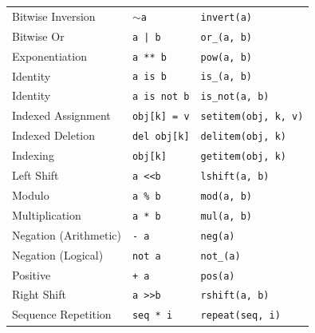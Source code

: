 \documentclass{l4proj}
\begin{document}
\begin{table}[]
\begin{tabular}{@{}lll@{}}
    Bitwise Inversion     & \texttt{$\sim$a}                        & \texttt{invert(a)}                                    \\
    Bitwise Or            & \texttt{a | b}                          & \texttt{or\_(a, b)}                                   \\
    Exponentiation        & \texttt{a ** b}                         & \texttt{pow(a, b)}                                    \\
    Identity              & \texttt{a is b}                         & \texttt{is\_(a, b)}                                   \\
    Identity              & \texttt{a is not b}                     & \texttt{is\_not(a, b)}                                \\
    Indexed Assignment    & \texttt{obj{[}k{]} = v}                 & \texttt{setitem(obj, k, v)}                           \\
    Indexed Deletion      & \texttt{del obj{[}k{]}}                 & \texttt{delitem(obj, k)}                              \\
    Indexing              & \texttt{obj{[}k{]}}                     & \texttt{getitem(obj, k)}                              \\
    Left Shift            & \texttt{a \textless{}\textless b}       & \texttt{lshift(a, b)}                                 \\
    Modulo                & \texttt{a \% b}                         & \texttt{mod(a, b)}                                    \\
    Multiplication        & \texttt{a * b}                          & \texttt{mul(a, b)}                                    \\
    Negation (Arithmetic) & \texttt{- a}                            & \texttt{neg(a)}                                       \\
    Negation (Logical)    & \texttt{not a}                          & \texttt{not\_(a)}                                     \\
    Positive              & \texttt{+ a}                            & \texttt{pos(a)}                                       \\
    Right Shift           & \texttt{a \textgreater{}\textgreater b} & \texttt{rshift(a, b)}                                 \\
    Sequence Repetition   & \texttt{seq * i}                        & \texttt{repeat(seq, i)}                               \\

\end{tabular}
\end{table}
\end{document}

